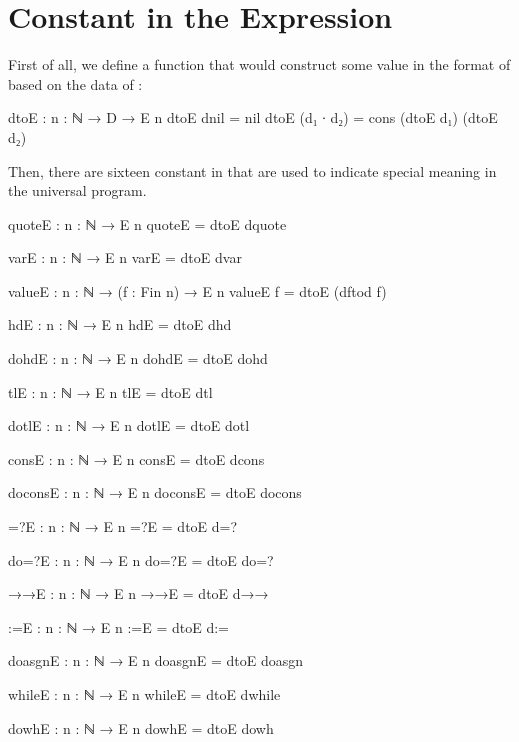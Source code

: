 \section{Constant in the Expression}\label{appendix:const of e}
First of all, we define a function that would construct some value in the format of  based on the data of :
\begin{code}
dtoE : {n : ℕ} → D → E n
dtoE dnil = nil
dtoE (d₁ ∙ d₂) = cons (dtoE d₁) (dtoE d₂)
\end{code}
Then, there are sixteen constant in  that are used to indicate special meaning in the universal \WHILE program.
\begin{code}[fontsize=\footnotesize]
quoteE : {n : ℕ} → E n
quoteE = dtoE dquote

varE : {n : ℕ} → E n
varE = dtoE dvar

valueE : {n : ℕ} → (f : Fin n) → E n
valueE f = dtoE (dftod f)

hdE : {n : ℕ} → E n
hdE = dtoE dhd

dohdE : {n : ℕ} → E n
dohdE = dtoE dohd

tlE : {n : ℕ} → E n
tlE = dtoE dtl

dotlE : {n : ℕ} → E n
dotlE = dtoE dotl

consE : {n : ℕ} → E n
consE = dtoE dcons

doconsE : {n : ℕ} → E n
doconsE = dtoE docons

=?E : {n : ℕ} → E n
=?E = dtoE d=?

do=?E : {n : ℕ} → E n
do=?E = dtoE do=?

→→E : {n : ℕ} → E n
→→E = dtoE d→→

:=E : {n : ℕ} → E n
:=E = dtoE d:=

doasgnE : {n : ℕ} → E n
doasgnE = dtoE doasgn

whileE : {n : ℕ} → E n
whileE = dtoE dwhile

dowhE : {n : ℕ} → E n
dowhE = dtoE dowh
\end{code}

